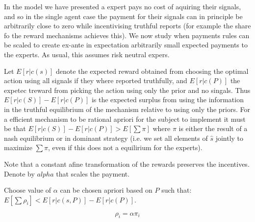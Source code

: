 
In the model we have presented a expert pays no cost of aquiring their signals, and so in the single agent case the payment for their signals can in principle be arbitrarily close to zero while incentivising truthful reports (for example the share fo the reward mechanisms achieves this). We now study when payments rules can be scaled to create ex-ante in expectation arbitrarily small expected payments to the experts. As usual, this assumes risk neutral expers. 



Let $E[r|c(s)]$ denote the expected reward obtained from choosing the optimal action using all signals if they where reported truthfully, and $E[r|c(P)] $ the expetec treward from picking the action using only the prior and no singals. Thus $E[r|c(S)] - E[r|c(P)] $ is the expected surplus from using the information in the truthful equilibrium of the mechanism relative to using only the priors. For a efficient mechanism to be rational apriori for the subject to implement it must be that $E[r|c(S)] - E[r|c(P)] > E[\sum \pi]$ where $\pi$ is either the result of a nash equilibrium or in dominant strategy (i.e. we set all elements of $\hat{s}$ jointly to maximize $\sum \pi$, even if this does not a equilirium for the experts).

Note that a constant afine transformation of the rewards preserves the incentives. Denote by $alpha$ that scales the payment.

\begin{mech}

Choose value of $\alpha$ can be chosen apriori based on $P$ such that: $ E[\sum \rho_i] < E[r|c(s,P)] - E[r|c(P)] $. 


\[
  \rho_i  = \alpha \pi_i
\]

\end{mech}


